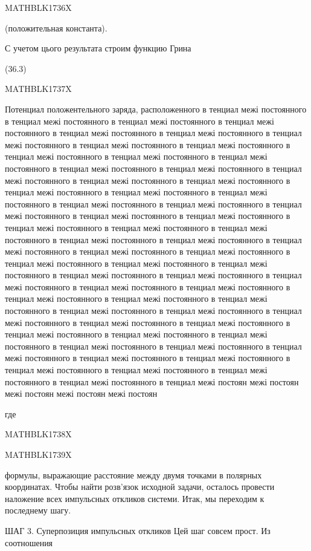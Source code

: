 \documentclass[
  ukrainian,
]{article}
\begin{document}
MATHBLK1736X

(положительная константа).

С учетом цього результата строим функцию Грина

(36.3)

MATHBLK1737X

Потенциал положентельного заряда, расположенного в тенциал межі
постоянного в тенциал межі постоянного в тенциал межі постоянного в
тенциал межі постоянного в тенциал межі постоянного в тенциал межі
постоянного в тенциал межі постоянного в тенциал межі постоянного в
тенциал межі постоянного в тенциал межі постоянного в тенциал межі
постоянного в тенциал межі постоянного в тенциал межі постоянного в
тенциал межі постоянного в тенциал межі постоянного в тенциал межі
постоянного в тенциал межі постоянного в тенциал межі постоянного в
тенциал межі постоянного в тенциал межі постоянного в тенциал межі
постоянного в тенциал межі постоянного в тенциал межі постоянного в
тенциал межі постоянного в тенциал межі постоянного в тенциал межі
постоянного в тенциал межі постоянного в тенциал межі постоянного в
тенциал межі постоянного в тенциал межі постоянного в тенциал межі
постоянного в тенциал межі постоянного в тенциал межі постоянного в
тенциал межі постоянного в тенциал межі постоянного в тенциал межі
постоянного в тенциал межі постоянного в тенциал межі постоянного в
тенциал межі постоянного в тенциал межі постоянного в тенциал межі
постоянного в тенциал межі постоянного в тенциал межі постоянного в
тенциал межі постоянного в тенциал межі постоянного в тенциал межі
постоянного в тенциал межі постоянного в тенциал межі постоянного в
тенциал межі постоянного в тенциал межі постоянного в тенциал межі
постоянного в тенциал межі постоянного в тенциал межі постоянного в
тенциал межі постоянного в тенциал межі постоянного в тенциал межі
постоянного в тенциал межі постоянного в тенциал межі постоянного в
тенциал межі постоянного в тенциал межі постоянного в тенциал межі
постоянного в тенциал межі постоян межі постоян межі постоян межі
постоян межі постоян

где

MATHBLK1738X

MATHBLK1739X

формулы, выражающие расстояние между двумя точками в полярных
координатах. Чтобы найти розв'язок исходной задачи, осталось провести
наложение всех импульсных откликов системи. Итак, мы переходим к
последнему шагу.

ШАГ 3. Суперпозиция импульсных откликов Цей шаг совсем прост. Из
соотношения
\end{document}
